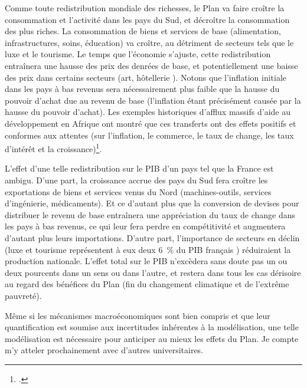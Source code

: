 \documentclass[a5paper,french,openany]{memoir}
\begin{document}
Comme toute redistribution mondiale des richesses, le Plan va faire croître la consommation et l'activité dans les pays du Sud, et décroître la consommation des plus riches. La consommation de biens et services de base (alimentation, infrastructures, soins, éducation) va croître, au détriment de secteurs tels que le luxe et le tourisme. Le temps que l'économie s'ajuste, cette redistribution entraînera une hausse des prix des denrées de base, et potentiellement une baisse des prix dans certains secteurs (art, hôtellerie%
). 
Notons que l'inflation initiale dans les pays à bas revenus sera nécessairement plus faible que la hausse du pouvoir d'achat due au revenu de base (l'inflation étant précisément causée par la hausse du pouvoir d'achat). Les exemples historiques d'afflux massifs d'aide au développement en Afrique ont montré que ces transferts ont des effets positifs et conformes aux attentes (sur l'inflation, le commerce, le taux de change, les taux d'intérêt et la croissance)\footnote{\cite{strand_revenue_2009,berg_macroeconomics_2007}.}.

L'effet d'une telle redistribution sur le PIB d'un pays tel que la France est ambigu. D'une part, la croissance accrue des pays du Sud fera croître les exportations de biens et services venus du Nord (machines-outils, services d'ingénierie, médicaments). Et ce d'autant plus que la conversion de devises pour distribuer le revenu de base entraînera une appréciation du taux de change dans les pays à bas revenus, ce qui leur fera perdre en compétitivité et augmentera d'autant plus leurs importations. D'autre part, l'importance de secteurs en déclin (luxe et tourisme représentent à eux deux 6~\% du PIB français%
) réduiraient la production nationale. L'effet total sur le PIB n'excèdera sans doute pas un ou deux pourcents dans un sens ou dans l'autre, et restera dans tous les cas dérisoire au regard des bénéfices du Plan (fin du changement climatique et de l'extrême pauvreté). 

Même si les mécanismes macroéconomiques sont bien compris et que leur quantification est soumise aux incertitudes inhérentes à la modélisation, une telle modélisation est nécessaire pour anticiper au mieux les effets du Plan. Je compte m'y atteler prochainement avec d'autres universitaires.
\end{document}
